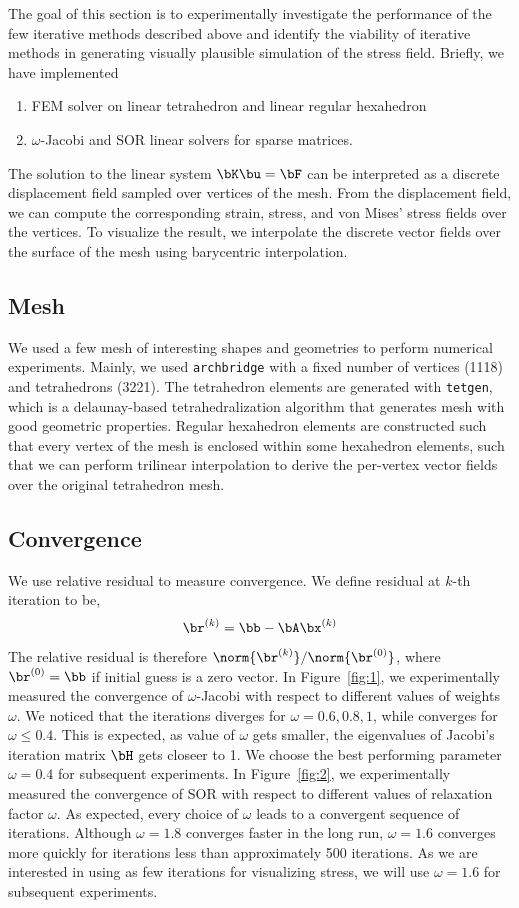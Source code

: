 \documentclass[11pt,titlepage]{article}
\begin{document}
The goal of this section is to experimentally investigate the performance of the few iterative methods described above and identify the viability of iterative methods in generating visually plausible simulation of the stress field. Briefly, we have implemented 
\begin{enumerate}
    \item FEM solver on linear tetrahedron and linear regular hexahedron
    \item $\omega$-Jacobi and SOR linear solvers for sparse matrices. 
\end{enumerate}
The solution to the linear system $\bK \bu = \bF$ can be interpreted as a discrete displacement field sampled over vertices of the mesh. From the displacement field, we can compute the corresponding strain, stress, and von Mises' stress fields over the vertices. To visualize the result, we interpolate the discrete vector fields over the surface of the mesh using barycentric interpolation.

\subsection{Mesh}

We used a few mesh of interesting shapes and geometries to perform numerical experiments. Mainly, we used \texttt{archbridge} with a fixed number of vertices (1118) and tetrahedrons (3221). The tetrahedron elements are generated with \texttt{tetgen}, which is a delaunay-based tetrahedralization algorithm that generates mesh with good geometric properties. Regular hexahedron elements are constructed such that every vertex of the mesh is enclosed within some hexahedron elements, such that we can perform trilinear interpolation to derive the per-vertex vector fields over the original tetrahedron mesh.

\subsection{Convergence}

We use relative residual to measure convergence. We define residual at $k$-th iteration to be,
\[
    \br^{(k)} = \bb - \bA \bx^{(k)}
\]
The relative residual is therefore $\norm{\br^{(k)}} / \norm{\br^{(0)}}$, where $\br^{(0)} = \bb$ if initial guess is a zero vector. In Figure~\ref{fig:1}, we experimentally measured the convergence of $\omega$-Jacobi with respect to different values of weights $\omega$. We noticed that the iterations diverges for $\omega=0.6,0.8,1$, while converges for $\omega\leq 0.4$. This is expected, as value of $\omega$ gets smaller, the eigenvalues of Jacobi's iteration matrix $\bH$ gets closeer to 1. We choose the best performing parameter $\omega=0.4$ for subsequent experiments. In Figure~\ref{fig:2}, we experimentally measured the convergence of SOR with respect to different values of relaxation factor $\omega$. As expected, every choice of $\omega$ leads to a convergent sequence of iterations. Although $\omega=1.8$ converges faster in the long run, $\omega=1.6$ converges more quickly for iterations less than approximately 500 iterations. As we are interested in using as few iterations for visualizing stress, we will use $\omega=1.6$ for subsequent experiments.
\end{document}
